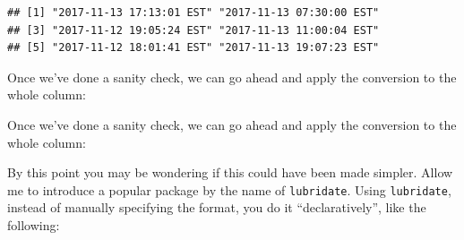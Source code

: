 \documentclass[]{article}
\newenvironment{Shaded}{\begin{snugshade}}{\end{snugshade}}
\newcommand{\CommentTok}[1]{\textcolor[rgb]{0.56,0.35,0.01}{\textit{#1}}}
\newcommand{\DataTypeTok}[1]{\textcolor[rgb]{0.13,0.29,0.53}{#1}}
\newcommand{\KeywordTok}[1]{\textcolor[rgb]{0.13,0.29,0.53}{\textbf{#1}}}
\newcommand{\NormalTok}[1]{#1}
\newcommand{\OperatorTok}[1]{\textcolor[rgb]{0.81,0.36,0.00}{\textbf{#1}}}
\newcommand{\StringTok}[1]{\textcolor[rgb]{0.31,0.60,0.02}{#1}}
\begin{document}
\begin{verbatim}
## [1] "2017-11-13 17:13:01 EST" "2017-11-13 07:30:00 EST"
## [3] "2017-11-12 19:05:24 EST" "2017-11-13 11:00:04 EST"
## [5] "2017-11-12 18:01:41 EST" "2017-11-13 19:07:23 EST"
\end{verbatim}

Once we've done a sanity check, we can go ahead and apply the conversion
to the whole column:

\begin{Shaded}
\end{Shaded}

Once we've done a sanity check, we can go ahead and apply the conversion
to the whole column:

\begin{Shaded}
\end{Shaded}

By this point you may be wondering if this could have been made simpler.
Allow me to introduce a popular package by the name of
\texttt{lubridate}. Using \texttt{lubridate}, instead of manually
specifying the format, you do it ``declaratively'', like the following:

\begin{Shaded}
\end{Shaded}
\end{document}
